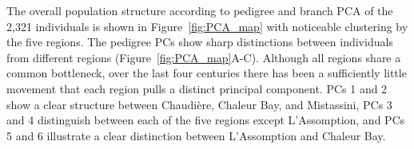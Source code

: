 The overall population structure according to pedigree and branch PCA
of the 2,321 individuals is shown in Figure~\ref{fig:PCA_map}
with noticeable clustering by the five regions.
%
The pedigree PCs show sharp distinctions between individuals from different regions
(Figure~\ref{fig:PCA_map}A-C).
%
Although all regions share a common bottleneck,
over the last four centuries 
there has been a sufficiently little movement that each region pulls a distinct principal component.
%
PCs 1 and 2 show a clear structure between Chaudière, Chaleur Bay, and Mistassini,
%
PCs 3 and 4 distinguish between each of the five regions except L'Assomption,
%
and PCs 5 and 6 illustrate a clear distinction between L'Assomption and Chaleur Bay.

